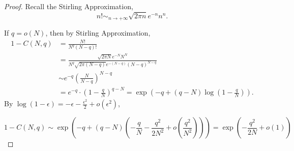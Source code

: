 \begin{proof}

Recall the Stirling Approximation,
\[
	n! \sim_{n \to +\infty} \sqrt{2\pi n} e^{-n} n^n.
\]

If $q = o(N)$, then by Stirling Approximation,
\begin{align*}
1 - C(N,q) &= \frac{N!}{N^q (N-q)!} \\
&= \frac{\sqrt{2\pi N} e^{-N} N^N}{N^q \sqrt{2\pi (N-q)} e^{-(N-q)} (N-q)^{N-q}} \\
&\sim e^{-q} \left( \frac{ N}{N-q} \right)^{N-q} \\
&= e^{-q} \cdot (1 - \frac{q}{N})^{q-N} = \exp(-q + (q-N)\log (1 - \frac{q}{N})).
\end{align*}
By $\log(1 - \epsilon) = -\epsilon - \frac{\epsilon^2}{2} + o(\epsilon^2)$,

\[
1 - C(N, q) \sim \exp(-q + (q-N)(-\frac{q}{N} - \frac{q^2}{2N^2} + o(\frac{q^2}{N^2}))) = \exp(-\frac{q^2}{2N} + o(1))
\]

\end{proof}


\pagebreak

\nocite{*}
\printbibliography


